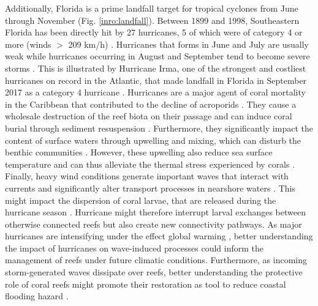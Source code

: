 Additionally, Florida is a prime landfall target for tropical cyclones from June through November (Fig. \ref{inro:landfall}). Between 1899 and 1998, Southeastern Florida has been directly hit by 27 hurricanes, 5 of which were of category 4 or more (winds $>$ 209 km/h) \citep{neumann1999tropical}. Hurricanes that forms in June and July are usually weak while hurricanes occurring in August and September tend to become severe storms \citep{banks2008reef}. This is illustrated by Hurricane Irma, one of the strongest and costliest hurricanes on record in the Atlantic, that made landfall in Florida in September 2017 as a category 4 hurricane \citep{irmaNOAA, xian2018brief}. Hurricanes are a major agent of coral mortality in the Caribbean that contributed to the decline of acroporids \citep{gardner2003long,gardner2005hurricanes,aronson2001white}. They cause a wholesale destruction of the reef biota on their passage and can induce coral burial through sediment resuspension \citep{banks2008reef, miller2008effects, tweel2014contribution}. Furthermore, they significantly impact the content of surface waters through upwelling and mixing, which can disturb the benthic communities \citep{wachnicka2019hurricane,varlas2020investigating}. However, these upwelling also reduce sea surface temperature and can thus alleviate the thermal stress experienced by corals \citep{wilkinson2008status}. Finally, heavy wind conditions generate important waves that interact with currents and significantly alter transport processes in nearshore waters \citep{niu2017role,mao2020particle}. This might impact the dispersion of coral larvae, that are released during the hurricane season \citep{hendee1998champ}. Hurricane might therefore interrupt larval exchanges between otherwise connected reefs but also create new connectivity pathways. As major hurricanes are intensifying under the effect global warming \citep{bhatia2019recent,knutson2020tropical}, better understanding the impact of hurricanes on wave-induced processes could inform the management of reefs under future climatic conditions. Furthermore, as incoming storm-generated waves dissipate over reefs, better understanding the protective role of coral reefs might promote their restoration as tool to reduce coastal flooding hazard \citep{roelvink2021coral}.

